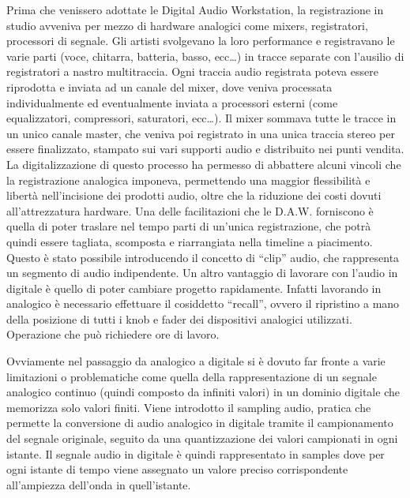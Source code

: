 \documentclass[a4paper,12pt]{report}
\begin{document}
Prima che venissero adottate le Digital Audio Workstation, la registrazione in studio avveniva per mezzo di hardware analogici come mixers, registratori, processori di segnale.
Gli artisti svolgevano la loro performance e registravano le varie parti (voce, chitarra, batteria, basso, ecc…) in tracce separate con l’ausilio di registratori a nastro multitraccia.
Ogni traccia audio registrata poteva essere riprodotta e inviata ad un canale del mixer, dove veniva processata individualmente ed eventualmente inviata a processori esterni (come equalizzatori, compressori, saturatori, ecc…).
Il mixer sommava tutte le tracce in un unico canale master, che veniva poi registrato in una unica traccia stereo per essere finalizzato, stampato sui vari supporti audio e distribuito nei punti vendita.
La digitalizzazione di questo processo ha permesso di abbattere alcuni vincoli che la registrazione analogica imponeva, permettendo una maggior flessibilità e libertà nell’incisione dei prodotti audio, oltre che la riduzione dei costi dovuti all’attrezzatura hardware.
Una delle facilitazioni che le D.A.W. forniscono è quella di poter traslare nel tempo parti di un'unica registrazione, che potrà quindi essere tagliata, scomposta e riarrangiata nella timeline a piacimento. Questo è stato possibile introducendo il concetto di “clip” audio, che rappresenta un segmento di audio indipendente. 
Un altro vantaggio di lavorare con l’audio in digitale è quello di poter cambiare progetto rapidamente. Infatti lavorando in analogico è necessario effettuare il cosiddetto “recall”, ovvero il ripristino a mano della posizione di tutti i knob e fader dei dispositivi analogici utilizzati. Operazione che può richiedere ore di lavoro.

Ovviamente nel passaggio da analogico a digitale si è dovuto far fronte a varie limitazioni o problematiche come quella della rappresentazione di un segnale analogico continuo (quindi composto da infiniti valori) in un dominio digitale che memorizza solo valori finiti. Viene introdotto il sampling audio, pratica che permette la conversione di audio analogico in digitale tramite il campionamento del segnale originale, seguito da una quantizzazione dei valori campionati in ogni istante.
Il segnale audio in digitale è quindi rappresentato in samples dove per ogni istante di tempo viene assegnato un valore preciso corrispondente all’ampiezza dell’onda in quell’istante.
\end{document}
